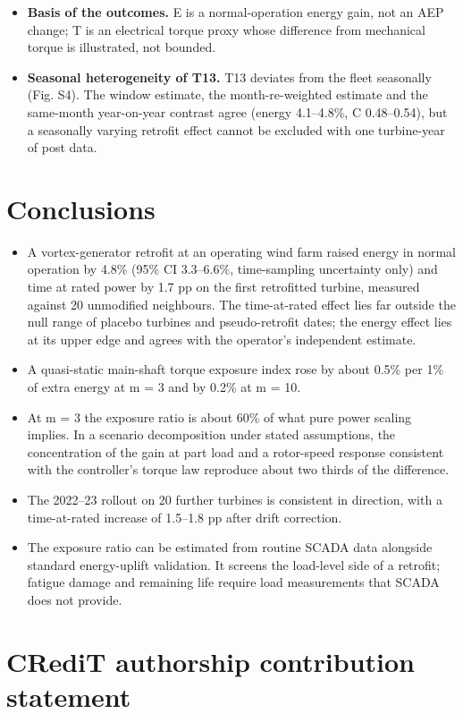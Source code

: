 \documentclass[preprint,12pt]{elsarticle}
\begin{document}
\begin{itemize}
\item
  \textbf{Basis of the outcomes.} E is a normal-operation energy gain, not an AEP change; T is an electrical torque proxy whose difference from mechanical torque is illustrated, not bounded.
\item
  \textbf{Seasonal heterogeneity of T13.} T13 deviates from the fleet seasonally (Fig. S4). The window estimate, the month-re-weighted estimate and the same-month year-on-year contrast agree (energy 4.1--4.8\%, C 0.48--0.54), but a seasonally varying retrofit effect cannot be excluded with one turbine-year of post data.
\end{itemize}

\section{Conclusions}

\begin{itemize}
\item
  A vortex-generator retrofit at an operating wind farm raised energy in normal operation by 4.8\% (95\% CI 3.3--6.6\%, time-sampling uncertainty only) and time at rated power by 1.7 pp on the first retrofitted turbine, measured against 20 unmodified neighbours. The time-at-rated effect lies far outside the null range of placebo turbines and pseudo-retrofit dates; the energy effect lies at its upper edge and agrees with the operator's independent estimate.
\item
  A quasi-static main-shaft torque exposure index rose by about 0.5\% per 1\% of extra energy at m = 3 and by 0.2\% at m = 10.
\item
  At m = 3 the exposure ratio is about 60\% of what pure power scaling implies. In a scenario decomposition under stated assumptions, the concentration of the gain at part load and a rotor-speed response consistent with the controller's torque law reproduce about two thirds of the difference.
\item
  The 2022--23 rollout on 20 further turbines is consistent in direction, with a time-at-rated increase of 1.5--1.8 pp after drift correction.
\item
  The exposure ratio can be estimated from routine SCADA data alongside standard energy-uplift validation. It screens the load-level side of a retrofit; fatigue damage and remaining life require load measurements that SCADA does not provide.
\end{itemize}


\section*{CRediT authorship contribution statement}
\end{document}
